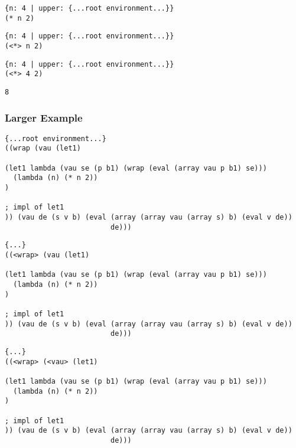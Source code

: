 \documentclass{beamer}
\begin{document}
\begin{frame}[fragile]
\footnotesize
\begin{verbatim}
{n: 4 | upper: {...root environment...}}
(* n 2)
\end{verbatim}
\end{frame}

\begin{frame}[fragile]
\footnotesize
\begin{verbatim}
{n: 4 | upper: {...root environment...}}
(<*> n 2)
\end{verbatim}
\end{frame}

\begin{frame}[fragile]
\footnotesize
\begin{verbatim}
{n: 4 | upper: {...root environment...}}
(<*> 4 2)
\end{verbatim}
\end{frame}

\begin{frame}[fragile]
\footnotesize
\begin{verbatim}
8
\end{verbatim}
\end{frame}

\begin{frame}[fragile]
\frametitle{Larger Example}
\footnotesize
\begin{verbatim}
{...root environment...}
((wrap (vau (let1)

(let1 lambda (vau se (p b1) (wrap (eval (array vau p b1) se)))
  (lambda (n) (* n 2))
)

; impl of let1
)) (vau de (s v b) (eval (array (array vau (array s) b) (eval v de))
                         de)))
\end{verbatim}
\end{frame}

\begin{frame}[fragile]
\footnotesize
\begin{verbatim}
{...}
((<wrap> (vau (let1)

(let1 lambda (vau se (p b1) (wrap (eval (array vau p b1) se)))
  (lambda (n) (* n 2))
)

; impl of let1
)) (vau de (s v b) (eval (array (array vau (array s) b) (eval v de))
                         de)))
\end{verbatim}
\end{frame}

\begin{frame}[fragile]
\footnotesize
\begin{verbatim}
{...}
((<wrap> (<vau> (let1)

(let1 lambda (vau se (p b1) (wrap (eval (array vau p b1) se)))
  (lambda (n) (* n 2))
)

; impl of let1
)) (vau de (s v b) (eval (array (array vau (array s) b) (eval v de))
                         de)))
\end{verbatim}
\end{frame}
\end{document}
